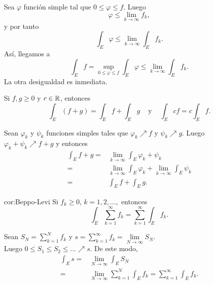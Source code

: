     \begin{demo}
    Sea $\varphi$ funci\'on simple tal que $0\leq \varphi \leq f$. Luego
    \[ \varphi \leq \lim\limits_{k \to \infty} f_k,\]
    y por tanto
    \[
\int_E \varphi \leq \lim\limits_{k \to \infty} \int_E f_k.
    \]
    As\'i, llegamos a 
    \[
    \int_E f=
    \sup\limits_{0\leq \varphi\leq f} \int_E \varphi
    \leq \lim\limits_{k \to \infty} \int_E f_k.
    \]
La otra desigualdad es inmediata. 
    \end{demo}
    
    
    \begin{teorema}{}
    Si $f,g\geq 0$ y $c \in \mathbb{R}$, entonces
    \[ 
    \int_E (f+g)= \int_E f+\int_E g \;\;\;\mbox{ y }\;\;\;
    \int_E cf=c\int_E f.
    \]
    \end{teorema}
    
     \begin{demo}
     Sean $\varphi_k$ y $\psi_k$ funciones simples tales que $\varphi_k \nearrow f$ y $\psi_k \nearrow g$.
     Luego $\varphi_k +\psi_k \nearrow f+g$ y entonces
     \[
     \begin{split}
         \int_E f+g =&\lim\limits_{k \to \infty} \int_E \varphi_k +\psi_k
         \\
         =&\lim\limits_{k \to \infty}\int_E \varphi_k
         +
         \lim\limits_{k \to \infty}\int_E \psi_k
         \\
         =&\int_E f +\int_E g.
     \end{split}
     \]
          \end{demo}
          
          \begin{corolario}{cor:Beppo-Levi}
          Si $f_k\geq 0$, $k=1,2,\ldots,$ entonces
          \[
          \int_E \sum\limits_{k=1}^{\infty} f_k
          =
          \sum\limits_{k=1}^{\infty} \int_E f_k.
          \]
          \end{corolario}
          
          \begin{demo}
          Sean $S_N=\sum\limits_{k=1}^N f_k$ y 
          $s=\sum\limits_{k=1}^{\infty} f_k=\lim\limits_{N \to \infty} S_N$. \\Luego
          $0\leq S_1 \leq S_2 \leq \ldots \nearrow s$. 
          De este modo, 
          \[
          \begin{split}
          \int_E s=&\lim\limits_{N \to \infty} \int_E S_N
          \\
          =&\lim\limits_{N \to  \infty} \sum\limits_{k=1}^N \int_E f_k
          = \sum\limits_{k=1}^{\infty} \int_E f_k.
          \end{split}
          \]
                    \end{demo}
                    
